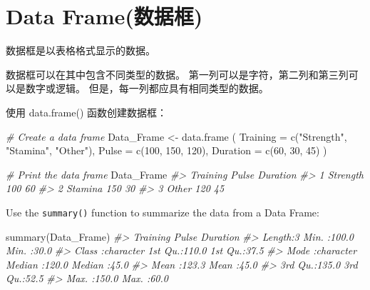 \documentclass[
]{book}
\newenvironment{Shaded}{\begin{snugshade}}{\end{snugshade}}
\newcommand{\AttributeTok}[1]{\textcolor[rgb]{0.77,0.63,0.00}{#1}}
\newcommand{\CommentTok}[1]{\textcolor[rgb]{0.56,0.35,0.01}{\textit{#1}}}
\newcommand{\DecValTok}[1]{\textcolor[rgb]{0.00,0.00,0.81}{#1}}
\newcommand{\FunctionTok}[1]{\textcolor[rgb]{0.00,0.00,0.00}{#1}}
\newcommand{\NormalTok}[1]{#1}
\newcommand{\OtherTok}[1]{\textcolor[rgb]{0.56,0.35,0.01}{#1}}
\newcommand{\StringTok}[1]{\textcolor[rgb]{0.31,0.60,0.02}{#1}}
\begin{document}
\hypertarget{data-frameux6570ux636eux6846}{%
\section{Data Frame(数据框)}\label{data-frameux6570ux636eux6846}}

数据框是以表格格式显示的数据。

数据框可以在其中包含不同类型的数据。 第一列可以是字符，第二列和第三列可以是数字或逻辑。 但是，每一列都应具有相同类型的数据。

使用 data.frame() 函数创建数据框：

\begin{Shaded}
\begin{Highlighting}[]
\CommentTok{\# Create a data frame}
\NormalTok{Data\_Frame }\OtherTok{\textless{}{-}} \FunctionTok{data.frame}\NormalTok{ (}
  \AttributeTok{Training =} \FunctionTok{c}\NormalTok{(}\StringTok{"Strength"}\NormalTok{, }\StringTok{"Stamina"}\NormalTok{, }\StringTok{"Other"}\NormalTok{),}
  \AttributeTok{Pulse =} \FunctionTok{c}\NormalTok{(}\DecValTok{100}\NormalTok{, }\DecValTok{150}\NormalTok{, }\DecValTok{120}\NormalTok{),}
  \AttributeTok{Duration =} \FunctionTok{c}\NormalTok{(}\DecValTok{60}\NormalTok{, }\DecValTok{30}\NormalTok{, }\DecValTok{45}\NormalTok{)}
\NormalTok{)}

\CommentTok{\# Print the data frame}
\NormalTok{Data\_Frame}
\CommentTok{\#\textgreater{}   Training Pulse Duration}
\CommentTok{\#\textgreater{} 1 Strength   100       60}
\CommentTok{\#\textgreater{} 2  Stamina   150       30}
\CommentTok{\#\textgreater{} 3    Other   120       45}
\end{Highlighting}
\end{Shaded}

Use the \texttt{summary()} function to summarize the data from a Data Frame:

\begin{Shaded}
\begin{Highlighting}[]
\FunctionTok{summary}\NormalTok{(Data\_Frame)}
\CommentTok{\#\textgreater{}    Training             Pulse          Duration   }
\CommentTok{\#\textgreater{}  Length:3           Min.   :100.0   Min.   :30.0  }
\CommentTok{\#\textgreater{}  Class :character   1st Qu.:110.0   1st Qu.:37.5  }
\CommentTok{\#\textgreater{}  Mode  :character   Median :120.0   Median :45.0  }
\CommentTok{\#\textgreater{}                     Mean   :123.3   Mean   :45.0  }
\CommentTok{\#\textgreater{}                     3rd Qu.:135.0   3rd Qu.:52.5  }
\CommentTok{\#\textgreater{}                     Max.   :150.0   Max.   :60.0}
\end{Highlighting}
\end{Shaded}
\end{document}
